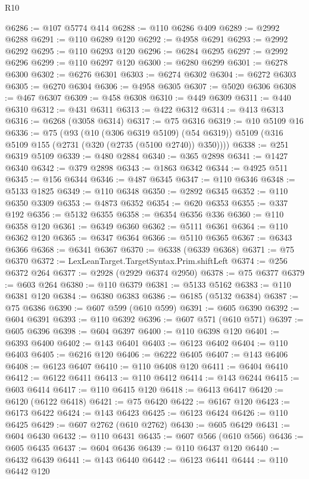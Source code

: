 \begin{lexlean}{R10}
\begin{coremodule}
@6286 := @107 @5774 @414
@6288 := @110 @6286 @409
@6289 := @2992 @6288
@6291 := @110 @6289 @120
@6292 := @4958 @6291
@6293 := @2992 @6292
@6295 := @110 @6293 @120
@6296 := @6284 @6295
@6297 := @2992 @6296
@6299 := @110 @6297 @120
@6300 := @6280 @6299
@6301 := @6278 @6300
@6302 := @6276 @6301
@6303 := @6274 @6302
@6304 := @6272 @6303
@6305 := @6270 @6304
@6306 := @4958 @6305
@6307 := @5020 @6306
@6308 := @467 @6307
@6309 := @458 @6308
@6310 := @449 @6309
@6311 := @440 @6310
@6312 := @431 @6311
@6313 := @422 @6312
@6314 := @413 @6313
@6316 := @6268 (@3058 @6314)
@6317 := @75 @6316
@6319 := @10 @5109 @16
@6336 := @75
    (@93
      (@10 (@306 @6319 @5109) (@54 @6319))
      @5109
      (@316 @5109 @155 (@2731 (@320 (@2735 (@5100 @2740)) @350))))
@6338 := @251 @6319 @5109
@6339 := @480 @2884
@6340 := @365 @2898
@6341 := @1427 @6340
@6342 := @379 @2898
@6343 := @1863 @6342
@6344 := @4925 @511
@6345 := @156 @6344
@6346 := @487 @6345
@6347 := @110 @6346
@6348 := @5133 @1825
@6349 := @110 @6348
@6350 := @2892 @6345
@6352 := @110 @6350 @3309
@6353 := @4873 @6352
@6354 := @620 @6353
@6355 := @337 @192
@6356 := @5132 @6355
@6358 := @6354 @6356 @336
@6360 := @110 @6358 @120
@6361 := @6349 @6360
@6362 := @5111 @6361
@6364 := @110 @6362 @120
@6365 := @6347 @6364
@6366 := @5110 @6365
@6367 := @6343 @6366
@6368 := @6341 @6367
@6370 := @6338 (@6339 @6368)
@6371 := @75 @6370
@6372 := LexLeanTarget.TargetSyntax.Prim.shiftLeft
@6374 := @256 @6372 @264
@6377 := @2928 (@2929 @6374 @2950)
@6378 := @75 @6377
@6379 := @603 @264
@6380 := @110 @6379
@6381 := @5133 @5162
@6383 := @110 @6381 @120
@6384 := @6380 @6383
@6386 := @6185 (@5132 @6384)
@6387 := @75 @6386
@6390 := @607 @599 (@610 @599)
@6391 := @605 @6390
@6392 := @604 @6391
@6393 := @110 @6392
@6396 := @607 @571 (@610 @571)
@6397 := @605 @6396
@6398 := @604 @6397
@6400 := @110 @6398 @120
@6401 := @6393 @6400
@6402 := @143 @6401
@6403 := @6123 @6402
@6404 := @110 @6403
@6405 := @6216 @120
@6406 := @6222 @6405
@6407 := @143 @6406
@6408 := @6123 @6407
@6410 := @110 @6408 @120
@6411 := @6404 @6410
@6412 := @6122 @6411
@6413 := @110 @6412
@6414 := @143 @6244
@6415 := @603 @6414
@6417 := @110 @6415 @120
@6418 := @6413 @6417
@6420 := @6120 (@6122 @6418)
@6421 := @75 @6420
@6422 := @6167 @120
@6423 := @6173 @6422
@6424 := @143 @6423
@6425 := @6123 @6424
@6426 := @110 @6425
@6429 := @607 @2762 (@610 @2762)
@6430 := @605 @6429
@6431 := @604 @6430
@6432 := @110 @6431
@6435 := @607 @566 (@610 @566)
@6436 := @605 @6435
@6437 := @604 @6436
@6439 := @110 @6437 @120
@6440 := @6432 @6439
@6441 := @143 @6440
@6442 := @6123 @6441
@6444 := @110 @6442 @120

\end{coremodule}
\end{lexlean}
